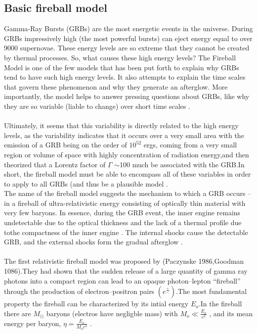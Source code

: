 \subsection{ Basic fireball model}
Gamma-Ray Bursts (GRBs) are  the most energetic events in the universe. During GRBs impressively high (the most powerful bursts) can eject energy equal to over 9000 supernovae. These energy levels are so extreme that they cannot be created by thermal processes. So, what causes these high energy levels?
The Fireball Model is one of the few models that has been put forth to explain why GRBs tend to have such high energy levels. It also attempts to explain the time scales that govern these phenomenon and why they generate an afterglow. More importantly, the model helps  to answer pressing questions about GRBs, like why they are so variable (liable to change) over short time scales \citep {13} \citep{14}.\\\\ 
Ultimately, it seems that this variability is directly related to the high energy levels, as the variability indicates that it occurs over a very small area with the emission of a GRB being on the order of $10^{52}$ ergs, coming from a very small  region or volume of space with highly concentration of radiation energy,and then  theorized that a Lorentz factor of $ \Gamma $ $ \sim $100 much be associated with the GRB.In short, the fireball model must be able to encompass all of these variables in order to apply to all GRBs (and thus be a plausible model \citep {14}.\\
The name of the fireball model suggests the mechanism to which a GRB occurs -- in a fireball of ultra-relativistic energy consisting of optically thin material with very few baryons. In essence, during the GRB event, the inner engine remains undetectable due to the optical thickness and the lack of a thermal profile due tothe compactness of the inner engine . The internal shocks cause the detectable GRB, and the external shocks form the gradual afterglow \citep{15}.\\\\
 The first relativistic fireball model was proposed by (Paczynske 1986,Goodman 1086).They had shown that the sudden release of a large quantity of gamma ray photons into a compact region can lead to an opaque photon–lepton “fireball” through the production of electron–positron pairs $(e^{\frac{+}{-}})$.The most fundamental property the fireball can be characterized by its intial energy $ E_{o}$.In the fireball there are $ M_{\odot} $ baryons (electros have negligble mass)  with $ M_{o} \ll\frac{E_{o}}{c^{2}}$ , and its mean energy per baryon, $\eta = \frac{E_{o}}{M_{o}c^{2}}$ \citep{14} \citep{15}.\\\\
